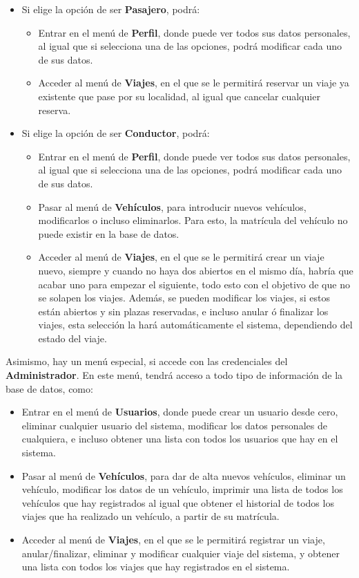 \begin{itemize}
  \item Si elige la opción de ser \textbf{Pasajero}, podrá:
  \begin{itemize}
    \item Entrar en el menú de \textbf{Perfil}, donde puede ver todos sus datos personales, al igual que si selecciona una de las opciones, podrá modificar cada uno de sus datos.
    \item Acceder al menú de \textbf{Viajes}, en el que se le permitirá reservar un viaje ya existente que pase por su localidad, al igual que cancelar cualquier reserva.
  \end{itemize}
  \item Si elige la opción de ser \textbf{Conductor}, podrá:
  \begin{itemize}
    \item Entrar en el menú de \textbf{Perfil}, donde puede ver todos sus datos personales, al igual que si selecciona una de las opciones, podrá modificar cada uno de sus datos.
    \item Pasar al menú de \textbf{Vehículos}, para introducir nuevos vehículos, modificarlos o incluso eliminarlos. Para esto, la matrícula del vehículo no puede existir en la base de datos.
    \item Acceder al menú de \textbf{Viajes}, en el que se le permitirá crear un viaje nuevo, siempre y cuando no haya dos abiertos en el mismo día, habría que acabar uno para empezar el siguiente,
    todo esto con el objetivo de que no se solapen los viajes. Además, se pueden modificar los viajes, si estos están abiertos y sin plazas reservadas, e incluso anular ó finalizar los viajes,
    esta selección la hará automáticamente el sistema, dependiendo del estado del viaje.
  \end{itemize}
\end{itemize}

Asimismo, hay un menú especial, si accede con las credenciales del \textbf{Administrador}. En este menú, tendrá acceso a todo tipo de información de la base de datos, como:
\begin{itemize}
  \item Entrar en el menú de \textbf{Usuarios}, donde puede crear un usuario desde cero, eliminar cualquier usuario del sistema, modificar los datos personales de cualquiera,
  e incluso obtener una lista con todos los usuarios que hay en el sistema.
  \item Pasar al menú de \textbf{Vehículos}, para dar de alta nuevos vehículos, eliminar un vehículo, modificar los datos de un vehículo, imprimir una lista de todos los vehículos que hay registrados
  al igual que obtener el historial de todos los viajes que ha realizado un vehículo, a partir de su matrícula.
  \item Acceder al menú de \textbf{Viajes}, en el que se le permitirá registrar un viaje, anular/finalizar, eliminar y modificar cualquier viaje del sistema, y obtener una lista con todos los viajes
  que hay registrados en el sistema.
\end{itemize}